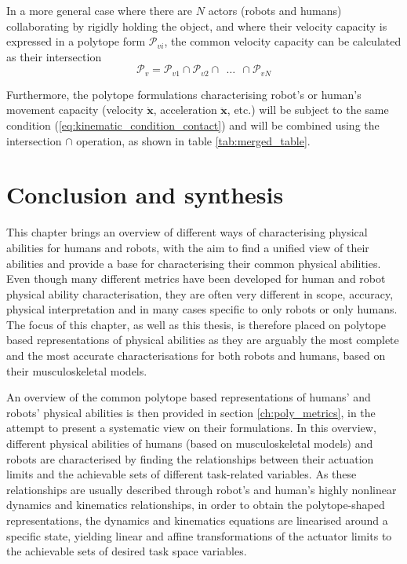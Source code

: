In a more general case where there are $N$ actors (robots and humans) collaborating by rigidly holding the object, and where their velocity capacity is expressed in a polytope form $\mathcal{P}_{vi}$, the common velocity capacity can be calculated as their intersection
\begin{equation}
    \mathcal{P}_v =  \mathcal{P}_{v1} \cap \mathcal{P}_{v2} \cap ~~ \ldots ~~\cap \mathcal{P}_{vN}
\end{equation}

Furthermore, the polytope formulations characterising robot's or human's movement capacity (velocity $\dot{\bm{x}}$, acceleration $\ddot{\bm{x}}$, etc.) will be subject to the same condition (\ref{eq:kinematic_condition_contact}) and will be combined using the intersection $\cap$ operation, as shown in table \ref{tab:merged_table}.

\section{Conclusion and synthesis}
\label{ch:collab_metrics_overview}

This chapter brings an overview of different ways of characterising physical abilities for humans and robots, with the aim to find a unified view of their abilities and provide a base for characterising their common physical abilities. Even though many different metrics have been developed for human and robot physical ability characterisation, they are often very different in scope, accuracy, physical interpretation and in many cases specific to only robots or only humans. The focus of this chapter, as well as this thesis, is therefore placed on polytope based representations of physical abilities as they are arguably the most complete and the most accurate characterisations for both robots and humans, based on their musculoskeletal models.

An overview of the common polytope based representations of humans' and robots' physical abilities is then provided in section \ref{ch:poly_metrics}, in the attempt to present a systematic view on their formulations. In this overview, different physical abilities of humans (based on musculoskeletal models) and robots are characterised by finding the relationships between their actuation limits and the achievable sets of different task-related variables. As these relationships are usually described through robot's and human's highly nonlinear dynamics and kinematics relationships, in order to obtain the polytope-shaped representations, the dynamics and kinematics equations are linearised around a specific state, yielding linear and affine transformations of the actuator limits to the achievable sets of desired task space variables.

